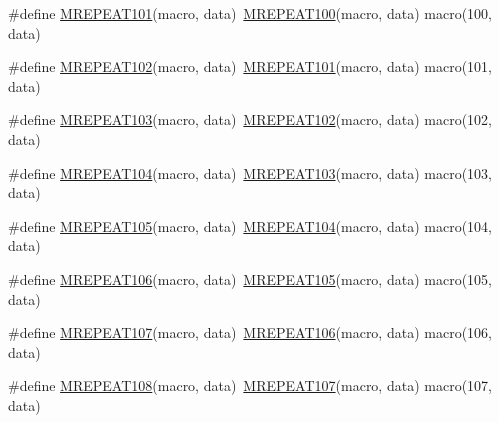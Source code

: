 \begin{DoxyCompactItemize}
\item 
\#define \mbox{\hyperlink{group__group__sam0__utils__mrepeat_gae02508a50d4516010d562970b2466731}{M\+R\+E\+P\+E\+A\+T101}}(macro,  data)~\mbox{\hyperlink{group__group__sam0__utils__mrepeat_ga2735125552e869ea1e49fa52ed6e175c}{M\+R\+E\+P\+E\+A\+T100}}(macro, data)   macro(100, data)
\item 
\#define \mbox{\hyperlink{group__group__sam0__utils__mrepeat_ga2418759d7f3f1ae57feab4b703f99662}{M\+R\+E\+P\+E\+A\+T102}}(macro,  data)~\mbox{\hyperlink{group__group__sam0__utils__mrepeat_gae02508a50d4516010d562970b2466731}{M\+R\+E\+P\+E\+A\+T101}}(macro, data)   macro(101, data)
\item 
\#define \mbox{\hyperlink{group__group__sam0__utils__mrepeat_ga5497848f0c9b8f33dbbad94bb98a8a8b}{M\+R\+E\+P\+E\+A\+T103}}(macro,  data)~\mbox{\hyperlink{group__group__sam0__utils__mrepeat_ga2418759d7f3f1ae57feab4b703f99662}{M\+R\+E\+P\+E\+A\+T102}}(macro, data)   macro(102, data)
\item 
\#define \mbox{\hyperlink{group__group__sam0__utils__mrepeat_ga22151fc326d5feb28b754cbc581902e1}{M\+R\+E\+P\+E\+A\+T104}}(macro,  data)~\mbox{\hyperlink{group__group__sam0__utils__mrepeat_ga5497848f0c9b8f33dbbad94bb98a8a8b}{M\+R\+E\+P\+E\+A\+T103}}(macro, data)   macro(103, data)
\item 
\#define \mbox{\hyperlink{group__group__sam0__utils__mrepeat_ga8df0585384d0052a9a2009876cd18459}{M\+R\+E\+P\+E\+A\+T105}}(macro,  data)~\mbox{\hyperlink{group__group__sam0__utils__mrepeat_ga22151fc326d5feb28b754cbc581902e1}{M\+R\+E\+P\+E\+A\+T104}}(macro, data)   macro(104, data)
\item 
\#define \mbox{\hyperlink{group__group__sam0__utils__mrepeat_ga65c66d814f582f426c18794de01f4475}{M\+R\+E\+P\+E\+A\+T106}}(macro,  data)~\mbox{\hyperlink{group__group__sam0__utils__mrepeat_ga8df0585384d0052a9a2009876cd18459}{M\+R\+E\+P\+E\+A\+T105}}(macro, data)   macro(105, data)
\item 
\#define \mbox{\hyperlink{group__group__sam0__utils__mrepeat_ga0cddcc3fa390ae9e30eaf07e9223be42}{M\+R\+E\+P\+E\+A\+T107}}(macro,  data)~\mbox{\hyperlink{group__group__sam0__utils__mrepeat_ga65c66d814f582f426c18794de01f4475}{M\+R\+E\+P\+E\+A\+T106}}(macro, data)   macro(106, data)
\item 
\#define \mbox{\hyperlink{group__group__sam0__utils__mrepeat_gacfbea84aacb4958d50fc747c7f512dcb}{M\+R\+E\+P\+E\+A\+T108}}(macro,  data)~\mbox{\hyperlink{group__group__sam0__utils__mrepeat_ga0cddcc3fa390ae9e30eaf07e9223be42}{M\+R\+E\+P\+E\+A\+T107}}(macro, data)   macro(107, data)

\end{DoxyCompactItemize}
